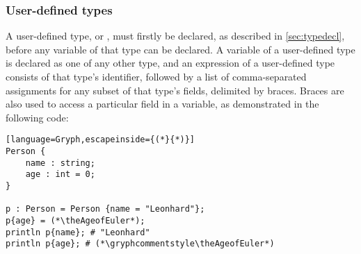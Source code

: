 \subsubsection{User-defined types}
\label{sec:usertypes}
A user-defined type, or , must firstly be declared, as described in \ref{sec:typedecl}, before any variable of that type can be declared. A variable of a user-defined type is declared as one of any other type, and an expression of a user-defined type consists of that type's identifier, followed by a list of comma-separated assignments for any subset of that type's fields, delimited by braces. Braces are also used to access a particular field in a  variable, as demonstrated in the following code:
\setcounter{AgeofEuler}{\year-1707}
\begin{lstlisting}[language=Gryph,escapeinside={(*}{*)}]
Person {
	name : string;
	age : int = 0;
}

p : Person = Person {name = "Leonhard"};
p{age} = (*\theAgeofEuler*);
println p{name}; # "Leonhard"
println p{age}; # (*\gryphcommentstyle\theAgeofEuler*)
\end{lstlisting}